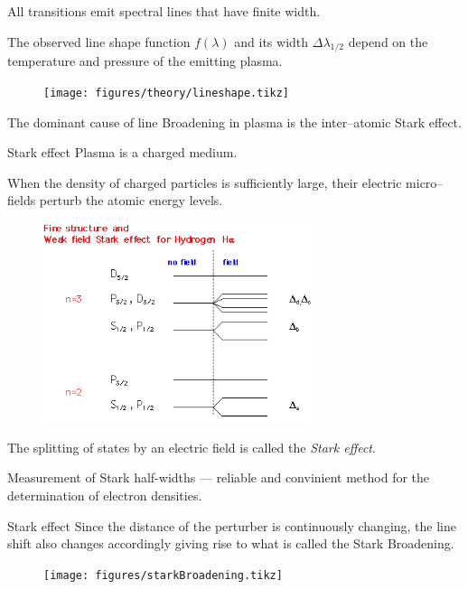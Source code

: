 \documentclass[]{beamer}
\begin{document}
\begin{frame}
  All transitions emit spectral lines that have finite width.
  
  The observed line shape function $f(\lambda)$ and its width $\Delta \lambda_{1/2}$ depend on the temperature and pressure of the emitting plasma.
\begin{figure}
\texttt{[image: figures/theory/lineshape.tikz]}
\end{figure}
The dominant cause of line Broadening in plasma is the inter--atomic Stark effect.
\end{frame}
\begin{frame}{Stark effect}
  Plasma is a charged medium.

  When the density of charged particles is sufficiently large, their electric micro--fields perturb the atomic energy levels.
  \begin{figure}
      \includegraphics[width=0.7\textwidth]{figures/stark_effect_1.png}
  \end{figure}
  The splitting of states by an electric field is called the \emph{Stark effect}.

  Measurement of Stark half-widths --- reliable and convinient method for the determination of electron densities.
  \end{frame}
  \begin{frame}{Stark effect}
    Since the distance of the perturber is continuously changing, the line shift also changes accordingly giving rise to what is called the Stark Broadening.
    \begin{figure}
    \texttt{[image: figures/starkBroadening.tikz]}
    \end{figure}
  \end{frame}
\end{document}

